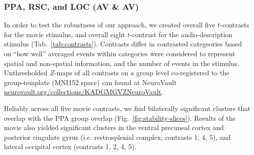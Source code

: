 \documentclass[english]{article}
\begin{document}
\subsubsection{PPA, RSC, and LOC (AV \& AV)}


In order to test the robustness of our approach, we created overall five
$t$-contrasts for the movie stimulus, and overall
eight $t$-contrast for the audio-description stimulus
(Tab.~\ref{tab:contrasts}).
Contrasts differ in contrasted categeories based on ``how well'' averaged events
within categories were considered to represent spatial and non-spatial
information, and the number of events in the stimulus.
Unthresholded $Z$-maps of all contrasts on a group level co-registered to the
group-template (MNI152 space) can found at NeuroVault
\href{https://neurovault.org/collections/KADGMGVZ/}{\url{neurovault.org/collections/KADGMGVZNeuroVault}}.


Reliably across all five movie contrasts, we find bilaterally significant
clusters that overlap with the PPA group overlap
(Fig.~\ref{fig:stability-slices}).
Results of the movie also yielded significant clusters in the ventral precuneal
cortex and posterior cingulate gyrus (i.e. restrosplenial complex; contrasts 1,
4, 5), and lateral occipital cortex (contrasts 1, 2, 4, 5).

\end{document}
